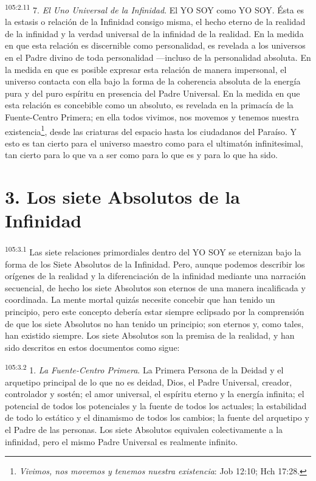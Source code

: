 \documentclass[twoside, 11pt]{book}
\begin{document}
\par
\textsuperscript{105:2.11} 7. \textit{El Uno Universal de la Infinidad}. El YO SOY como YO SOY. Ésta es la estasis o relación de la Infinidad consigo misma, el hecho eterno de la realidad de la infinidad y la verdad universal de la infinidad de la realidad. En la medida en que esta relación es discernible como personalidad, es revelada a los universos en el Padre divino de toda personalidad ---incluso de la personalidad absoluta. En la medida en que es posible expresar esta relación de manera impersonal, el universo contacta con ella bajo la forma de la coherencia absoluta de la energía pura y del puro espíritu en presencia del Padre Universal. En la medida en que esta relación es concebible como un absoluto, es revelada en la primacía de la Fuente-Centro Primera; en ella todos vivimos, nos movemos y tenemos nuestra existencia\footnote{\textit{Vivimos, nos movemos y tenemos nuestra existencia}: Job 12:10; Hch 17:28.}, desde las criaturas del espacio hasta los ciudadanos del Paraíso. Y esto es tan cierto para el universo maestro como para el ultimatón infinitesimal, tan cierto para lo que va a ser como para lo que es y para lo que ha sido.

\section*{3. Los siete Absolutos de la Infinidad}
\par
\textsuperscript{105:3.1} Las siete relaciones primordiales dentro del YO SOY se eternizan bajo la forma de los Siete Absolutos de la Infinidad. Pero, aunque podemos describir los orígenes de la realidad y la diferenciación de la infinidad mediante una narración secuencial, de hecho los siete Absolutos son eternos de una manera incalificada y coordinada. La mente mortal quizás necesite concebir que han tenido un principio, pero este concepto debería estar siempre eclipsado por la comprensión de que los siete Absolutos no han tenido un principio; son eternos y, como tales, han existido siempre. Los siete Absolutos son la premisa de la realidad, y han sido descritos en estos documentos como sigue:

\par
\textsuperscript{105:3.2} 1. \textit{La Fuente-Centro Primera}. La Primera Persona de la Deidad y el arquetipo principal de lo que no es deidad, Dios, el Padre Universal, creador, controlador y sostén; el amor universal, el espíritu eterno y la energía infinita; el potencial de todos los potenciales y la fuente de todos los actuales; la estabilidad de todo lo estático y el dinamismo de todos los cambios; la fuente del arquetipo y el Padre de las personas. Los siete Absolutos equivalen colectivamente a la infinidad, pero el mismo Padre Universal es realmente infinito.
\end{document}
